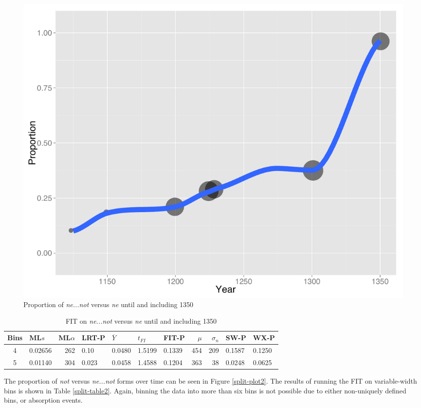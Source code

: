 \begin{figure}
\centering
     \includegraphics[width=\textwidth]{split-plot1.pdf}
\caption{Proportion of \textit{\color{blue} ne...not}  versus  \textit{\color{red}  ne} until and including 1350}
\label{split-plot1}
\end{figure}

\begin{table}[ht]
\centering
\begin{tabular}{c  l  r  l  l  l  l   r  r  l  l}
  \hline
Bins & ML$s$ & ML$\alpha$ & LRT-P & $\overline{Y}$ & $t_{FI}$ & FIT-P & $\mu$ & $\sigma_n$ & SW-P & WX-P\\ 
  \hline
  4 & 0.02656 & 262 & 0.10 & 0.0480 & 1.5199 & 0.1339 & 454 & 209 & 0.1587 & 0.1250 \\ 
  5 & 0.01140 & 304 & 0.023 & 0.0458 & 1.4588 & 0.1204 & 363 & 38 & 0.0248 & 0.0625 \\
   \hline
\end{tabular}
\caption{FIT on \textit{\color{blue} ne...not}  versus  \textit{\color{red}  ne} until and including 1350}
\label{split-table1}
\end{table}

The proportion of \textit{\color{green} not}  versus \textit{\color{blue} ne...not} forms over time can be seen in Figure \ref{split-plot2}. The results of running the FIT on variable-width bins is shown in Table \ref{split-table2}. Again, binning the data into more than six bins is not possible due to either  non-uniquely defined bins, or absorption events.

